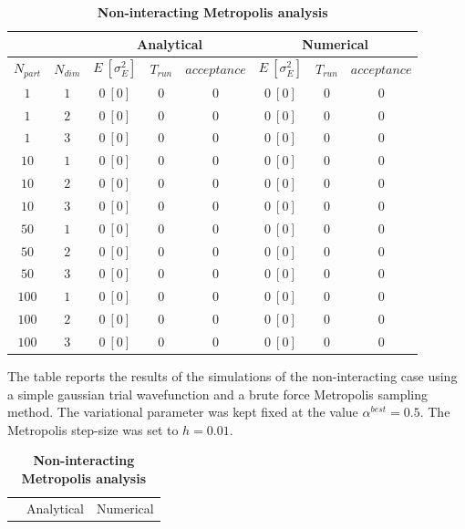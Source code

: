 \begin{table}[hbtp]
    \centering
    \begin{tabular}{cc|ccc|ccc}
        \multicolumn{2}{c}{} & \multicolumn{3}{|c|}{Analytical} & \multicolumn{3}{c}{Numerical} \\
        \hline
         $N_{part}$ & $N_{dim}$ & $E \ [\sigma^2_E]$ & $T_{run}$ & $acceptance$ & $E \ [\sigma^2_E]$ & $T_{run}$ & $acceptance$ \\
         \hline
         $1$ & $1$ & $0 \ [0]$ & $0$ & $0$  & $0 \ [0]$ & $0$ & $0$ \\
         $1$ & $2$ & $0 \ [0]$ & $0$ & $0$  & $0 \ [0]$ & $0$ & $0$ \\
         $1$ & $3$ & $0 \ [0]$ & $0$ & $0$  & $0 \ [0]$ & $0$ & $0$ \\
         \hline
         $10$ & $1$ & $0 \ [0]$ & $0$ & $0$  & $0 \ [0]$ & $0$ & $0$ \\
         $10$ & $2$ & $0 \ [0]$ & $0$ & $0$  & $0 \ [0]$ & $0$ & $0$ \\
         $10$ & $3$ & $0 \ [0]$ & $0$ & $0$  & $0 \ [0]$ & $0$ & $0$ \\
         \hline
         $50$ & $1$ & $0 \ [0]$ & $0$ & $0$  & $0 \ [0]$ & $0$ & $0$ \\
         $50$ & $2$ & $0 \ [0]$ & $0$ & $0$  & $0 \ [0]$ & $0$ & $0$ \\
         $50$ & $3$ & $0 \ [0]$ & $0$ & $0$  & $0 \ [0]$ & $0$ & $0$ \\
         \hline
         $100$ & $1$ & $0 \ [0]$ & $0$ & $0$  & $0 \ [0]$ & $0$ & $0$ \\
         $100$ & $2$ & $0 \ [0]$ & $0$ & $0$  & $0 \ [0]$ & $0$ & $0$ \\
         $100$ & $3$ & $0 \ [0]$ & $0$ & $0$  & $0 \ [0]$ & $0$ & $0$ \\
         \hline
    \end{tabular}
    \caption{\bfseries Non-interacting Metropolis analysis}{The table reports the results of the simulations of the non-interacting case using a simple gaussian trial wavefunction and a brute force Metropolis sampling method. The variational parameter was kept fixed at the value $\alpha^{best}=0.5$. The Metropolis step-size was set to $h=0.01$.}
    \label{tab:tab_x_metropolis}
    \vspace{15pt}
    \centering
    \begin{tabular}{cc|ccc|ccc}
        \multicolumn{2}{c}{} & \multicolumn{3}{|c|}{Analytical} & \multicolumn{3}{c}{Numerical} \\

\end{tabular}
\end{table}
